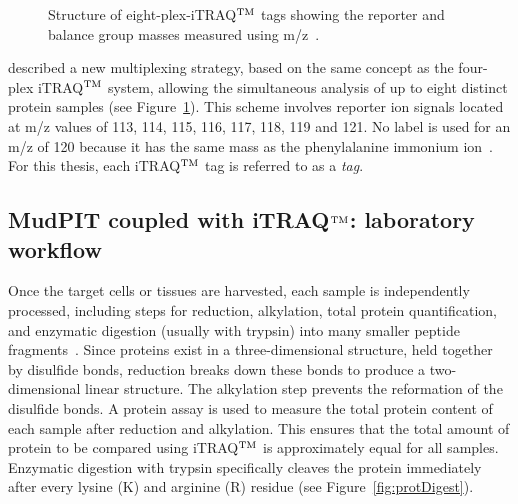 \begin{figure}[!htb]
\caption{Structure of eight-plex-iTRAQ$^{\rm TM}$ tags showing the reporter and balance group masses measured using m/z~\citep{Choe2007}.}
\label{fig:eight-plex}
\end{figure}

\cite{Choe2007} described a new multiplexing strategy, based on the same concept as the four-plex iTRAQ$^{\rm TM}$ system, allowing the simultaneous analysis of up to eight distinct protein samples (see Figure~\ref{fig:eight-plex}). This scheme involves reporter ion signals located at m/z values of 113, 114, 115, 116, 117, 118, 119 and 121. No label is used for an m/z of 120 because it has the same mass as the phenylalanine immonium ion~\citep{Pierce2008}.  For this thesis, each iTRAQ$^{\rm TM}$ tag is referred to as a \emph{tag}. 

\subsection{MudPIT coupled with iTRAQ$^{\rm TM}$: laboratory workflow}\label{sec:MudPITiTRAQ}
Once the target cells or tissues are harvested, each sample is independently processed, including steps for reduction, alkylation, total protein quantification, and enzymatic digestion (usually with trypsin) into many smaller peptide fragments~\citep{Ross2004}. Since proteins exist in a three-dimensional structure, held together by disulfide bonds, reduction breaks down these bonds to produce a two-dimensional linear structure. The alkylation step prevents the reformation of the disulfide bonds. A protein assay is used to measure the total protein content of each sample after reduction and alkylation. This ensures that the total amount of protein to be compared using iTRAQ$^{\rm TM}$ is approximately equal for all samples. Enzymatic digestion with trypsin specifically cleaves the protein immediately after every lysine (K) and arginine (R) residue (see Figure~\ref{fig:protDigest}). 

